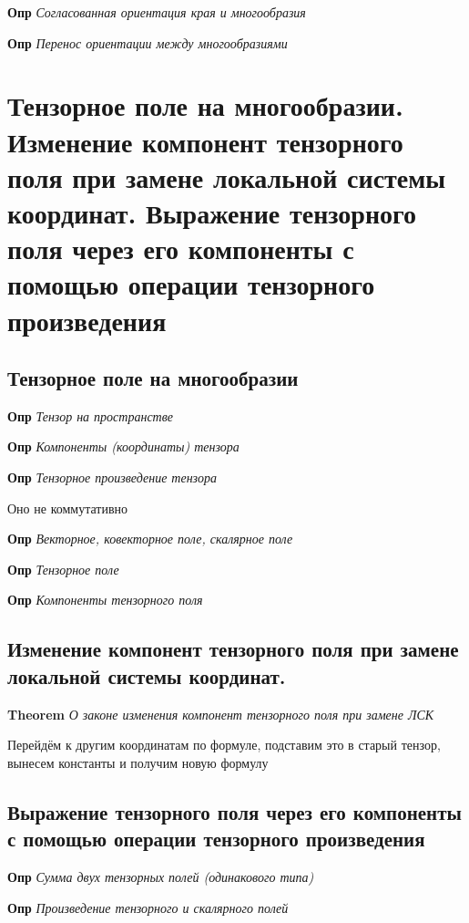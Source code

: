\documentclass[a4paper, 14pt]{article}
\begin{document}
    \textbf{Опр} \textit{Согласованная ориентация края и многообразия}
    
    \textbf{Опр} \textit{Перенос ориентации между многообразиями}
    
    \section{Тензорное поле на многообразии.
    Изменение компонент тензорного поля при замене локальной системы координат.
    Выражение тензорного поля через его компоненты с помощью операции тензорного произведения}
    
    \subsection{Тензорное поле на многообразии}
    
    \textbf{Опр} \textit{Тензор на пространстве}
    
    \textbf{Опр} \textit{Компоненты (координаты) тензора}
    
    \textbf{Опр} \textit{Тензорное произведение тензора}
    
    Оно не коммутативно
    
    \textbf{Опр} \textit{Векторное, ковекторное поле, скалярное поле}
    
    \textbf{Опр} \textit{Тензорное поле}
    
    \textbf{Опр} \textit{Компоненты тензорного поля}
    
    \subsection{Изменение компонент тензорного поля при замене локальной системы координат.}
    
    \textbf{Theorem} \textit{О законе изменения компонент тензорного поля при замене ЛСК}
    
    Перейдём к другим координатам по формуле, подставим это в старый тензор, вынесем константы и получим новую формулу
    
    \subsection{Выражение тензорного поля через его компоненты с помощью операции тензорного произведения}
    
    \textbf{Опр} \textit{Сумма двух тензорных полей (одинакового типа)}
    
    \textbf{Опр} \textit{Произведение тензорного и скалярного полей}
    
\end{document}
